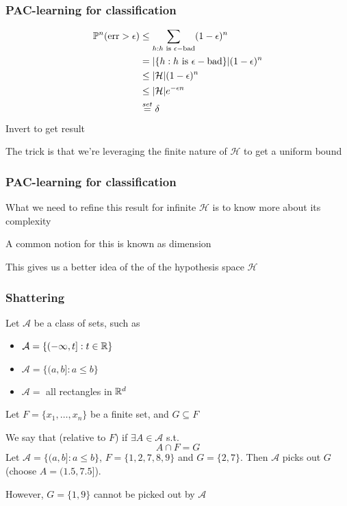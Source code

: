 \documentclass[12pt]{beamer}
\begin{document}
\begin{frame}[fragile]
\frametitle{PAC-learning for classification}
\begin{align*}
\P^n (\textrm{err} > \epsilon) 
& \leq
\sum_{h: h \textrm{ is } \epsilon-\textrm{bad}} (1-\epsilon)^n \\
& =
|\{h: h \textrm{ is } \epsilon-\textrm{bad}\}| (1-\epsilon)^n \\
& \leq
|\mathcal{H}| (1-\epsilon)^n \\
& \leq
|\mathcal{H}| e^{-\epsilon n} \\
& \stackrel{set}{=}
\delta
\end{align*}
Invert to get result

\vsp
The trick is that we're leveraging the finite nature of $\mathcal{H}$ to get a uniform bound

\end{frame}

\begin{frame}[fragile]
\frametitle{PAC-learning for classification}
What we need to refine this result for infinite $\mathcal{H}$ is to know more about its  complexity

\vsp
A common notion for this is known as  dimension

\vsp
This gives us a better idea of the  of the hypothesis space $\mathcal{H}$
\end{frame}

\begin{frame}[fragile]
\frametitle{Shattering}
Let $\mathcal{A}$ be a class of sets, such as
\begin{itemize}
\item $\mathcal{A} = \{(-\infty,t]:t\in\R\}$
\item $\mathcal{A} = \{(a,b]:a \leq b\}$
\item $\mathcal{A} = $ all rectangles in $\R^d$
\end{itemize}
Let $F = \{x_1,\ldots,x_n\}$ be a finite set, and $G \subseteq F$

\vsp
We say that  (relative to $F$) if $\exists A \in \mathcal{A}$ s.t.
\[
A \cap F = G
\]
 Let $\mathcal{A} = \{(a,b]:a \leq b\}$, $F = \{1,2,7,8,9\}$ and $G = \{2,7\}$.  Then
$\mathcal{A}$ picks out $G$ (choose $A = (1.5,7.5]$).

However, $G = \{1,9\}$ cannot be picked out by $\mathcal{A}$
\end{frame}
\end{document}
